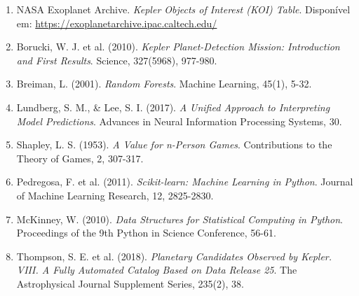 \documentclass[12pt, a4paper]{report}
\begin{document}
\begin{enumerate}
    \item NASA Exoplanet Archive. \textit{Kepler Objects of Interest (KOI) Table}. Disponível em: \url{https://exoplanetarchive.ipac.caltech.edu/}

    \item Borucki, W. J. et al. (2010). \textit{Kepler Planet-Detection Mission: Introduction and First Results}. Science, 327(5968), 977-980.

    \item Breiman, L. (2001). \textit{Random Forests}. Machine Learning, 45(1), 5-32.

    \item Lundberg, S. M., \& Lee, S. I. (2017). \textit{A Unified Approach to Interpreting Model Predictions}. Advances in Neural Information Processing Systems, 30.

    \item Shapley, L. S. (1953). \textit{A Value for n-Person Games}. Contributions to the Theory of Games, 2, 307-317.

    \item Pedregosa, F. et al. (2011). \textit{Scikit-learn: Machine Learning in Python}. Journal of Machine Learning Research, 12, 2825-2830.

    \item McKinney, W. (2010). \textit{Data Structures for Statistical Computing in Python}. Proceedings of the 9th Python in Science Conference, 56-61.

    \item Thompson, S. E. et al. (2018). \textit{Planetary Candidates Observed by Kepler. VIII. A Fully Automated Catalog Based on Data Release 25}. The Astrophysical Journal Supplement Series, 235(2), 38.
\end{enumerate}

\end{document}
